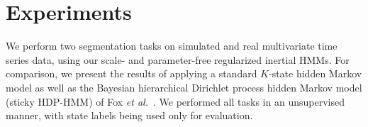 \documentclass[12pt]{article}
\makeatletter
\def\BState{\State\hskip-\ALG@thistlm}
\makeatother
\begin{document}
\begin{algorithm}
\caption{}
\label{alg:incremental}
\end{algorithm}

%
%
\section{Experiments}\label{sec:Experiments}

We perform two segmentation tasks on simulated and real multivariate time series data, using our scale- and parameter-free regularized inertial HMMs. For comparison, we present the results of applying a standard $K$-state hidden Markov model as well as the Bayesian hierarchical Dirichlet process hidden Markov model (sticky HDP-HMM) of Fox \emph{et al.}~\cite{fox2011sticky}. We performed all tasks in an unsupervised manner, with state labels being used only for evaluation.
\end{document}
